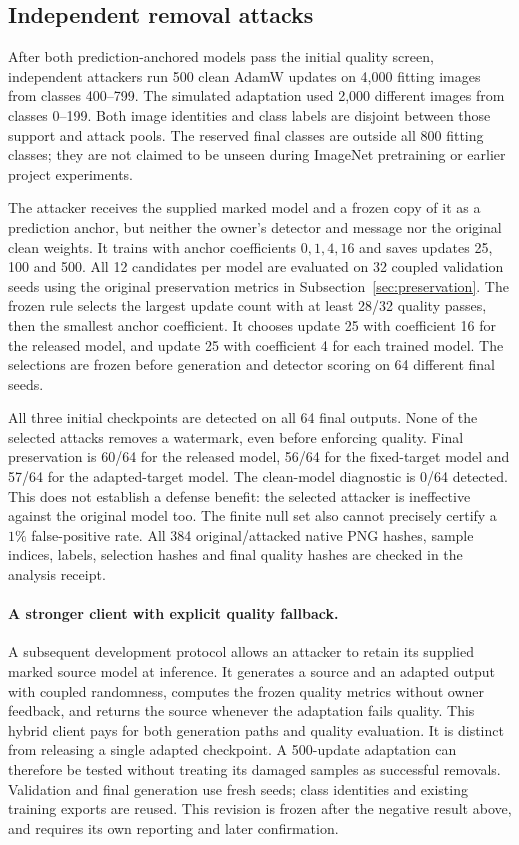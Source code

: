 \subsection{Independent removal attacks}
\label{sec:preserving_attack}
After both prediction-anchored models pass the initial quality screen, independent attackers run 500 clean AdamW updates on 4,000 fitting images from classes 400--799. The simulated adaptation used 2,000 different images from classes 0--199. Both image identities and class labels are disjoint between those support and attack pools. The reserved final classes are outside all 800 fitting classes; they are not claimed to be unseen during ImageNet pretraining or earlier project experiments.

The attacker receives the supplied marked model and a frozen copy of it as a prediction anchor, but neither the owner's detector and message nor the original clean weights. It trains with anchor coefficients $0,1,4,16$ and saves updates 25, 100 and 500. All 12 candidates per model are evaluated on 32 coupled validation seeds using the original preservation metrics in Subsection~\ref{sec:preservation}. The frozen rule selects the largest update count with at least 28/32 quality passes, then the smallest anchor coefficient. It chooses update 25 with coefficient 16 for the released model, and update 25 with coefficient 4 for each trained model. The selections are frozen before generation and detector scoring on 64 different final seeds.



All three initial checkpoints are detected on all 64 final outputs. None of the selected attacks removes a watermark, even before enforcing quality. Final preservation is 60/64 for the released model, 56/64 for the fixed-target model and 57/64 for the adapted-target model. The clean-model diagnostic is 0/64 detected. This does not establish a defense benefit: the selected attacker is ineffective against the original model too. The finite null set also cannot precisely certify a $1\%$ false-positive rate. All 384 original/attacked native PNG hashes, sample indices, labels, selection hashes and final quality hashes are checked in the analysis receipt.

\paragraph{A stronger client with explicit quality fallback.} A subsequent development protocol allows an attacker to retain its supplied marked source model at inference. It generates a source and an adapted output with coupled randomness, computes the frozen quality metrics without owner feedback, and returns the source whenever the adaptation fails quality. This hybrid client pays for both generation paths and quality evaluation. It is distinct from releasing a single adapted checkpoint. A 500-update adaptation can therefore be tested without treating its damaged samples as successful removals. Validation and final generation use fresh seeds; class identities and existing training exports are reused. This revision is frozen after the negative result above, and requires its own reporting and later confirmation.
